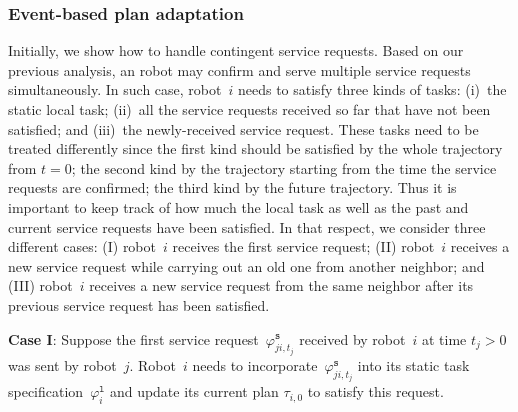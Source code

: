 \subsubsection{Event-based plan adaptation}\label{ch03:sec:plan-adapt}
Initially, we show how to handle contingent service requests.
Based on our previous analysis, an robot may confirm and serve multiple service requests simultaneously.
In such case, robot~$i$ needs to satisfy three kinds of tasks: (i)~the static local task;
(ii)~all the service requests received so far that have not been satisfied;
 and (iii)~the newly-received service request.
These tasks need to be treated differently since the first kind should be satisfied by the whole trajectory from $t=0$; the second kind by the trajectory starting from the time the service requests are confirmed; the third kind by the future trajectory.
Thus it is important to keep track of how much the local task as well as the past and current service requests have been satisfied.
In that respect, we consider three different cases: (I) robot~$i$ receives the first service request; (II) robot~$i$ receives a new service request  while carrying out an old one from another neighbor; and (III) robot~$i$ receives a new service request from the same neighbor after its previous service request has been satisfied.

\textbf{Case I}: Suppose the first service request~$\varphi_{ji,t_j}^\texttt{s}$ received by robot~$i$ at time $t_j>0$ was sent by robot~$j$. Robot~$i$ needs to incorporate~$\varphi_{ji,t_j}^\texttt{s}$ into its static task specification~$\varphi_{i}^\texttt{l}$ and update its current plan $\tau_{i,0}$ to satisfy this request.

